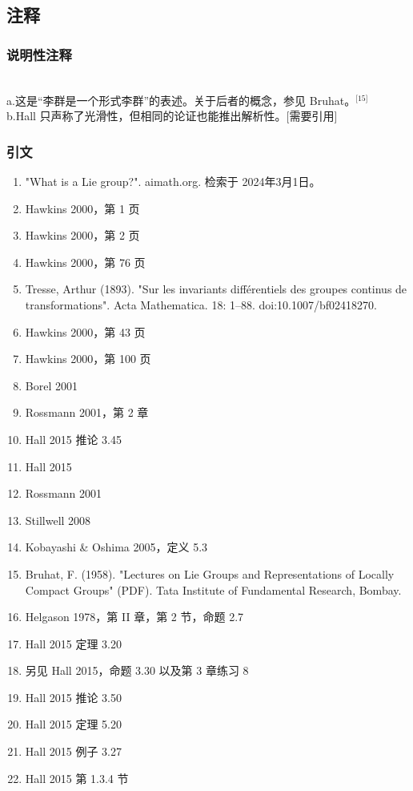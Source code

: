 \subsection{注释}
\subsubsection{说明性注释}\\
a.这是“李群是一个形式李群”的表述。关于后者的概念，参见 Bruhat。\(^\text{[15]}\)\\
b.Hall 只声称了光滑性，但相同的论证也能推出解析性。[需要引用]
\subsubsection{引文}
\begin{enumerate}
\item "What is a Lie group?". aimath.org. 检索于 2024年3月1日。
\item Hawkins 2000，第 1 页
\item Hawkins 2000，第 2 页
\item Hawkins 2000，第 76 页
\item Tresse, Arthur (1893). "Sur les invariants différentiels des groupes continus de transformations". Acta Mathematica. 18: 1–88. doi:10.1007/bf02418270.
\item Hawkins 2000，第 43 页
\item Hawkins 2000，第 100 页
\item Borel 2001
\item Rossmann 2001，第 2 章
\item Hall 2015 推论 3.45
\item Hall 2015
\item Rossmann 2001
\item Stillwell 2008
\item Kobayashi & Oshima 2005，定义 5.3
\item Bruhat, F. (1958). "Lectures on Lie Groups and Representations of Locally Compact Groups" (PDF). Tata Institute of Fundamental Research, Bombay.
\item Helgason 1978，第 II 章，第 2 节，命题 2.7
\item Hall 2015 定理 3.20
\item 另见 Hall 2015，命题 3.30 以及第 3 章练习 8
\item Hall 2015 推论 3.50
\item Hall 2015 定理 5.20
\item Hall 2015 例子 3.27
\item Hall 2015 第 1.3.4 节

\end{enumerate}
